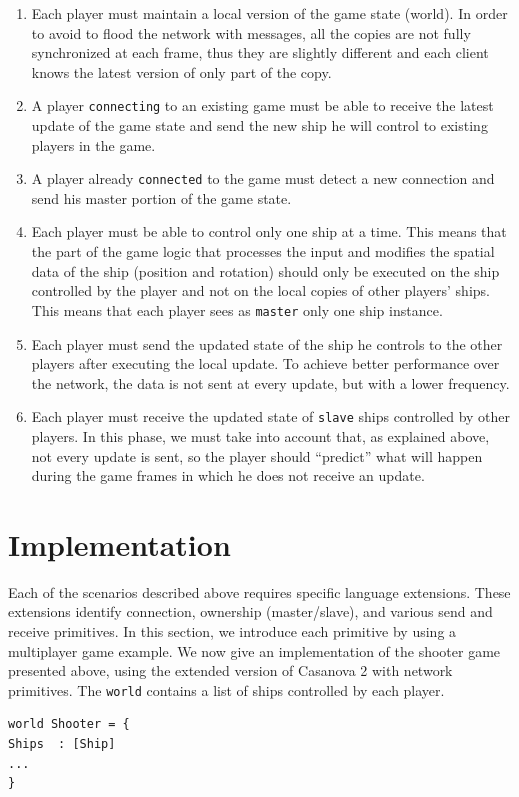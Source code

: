 \begin{enumerate}
	\item Each player must maintain a local version of the game state (world). In order to avoid to flood the network with messages, all the copies are not fully synchronized at each frame, thus they are slightly different and each client knows the latest version of only part of the copy.
	\item A player \texttt{connecting} to an existing game must be able to receive the latest update of the game state and send the new ship he will control to existing players in the game.
	\item A player already \texttt{connected} to the game must detect a new connection and send his master portion of the game state.
	\item Each player must be able to control only one ship at a time. This means that the part of the game logic that processes the input and modifies the spatial data of the ship (position and rotation) should only be executed on the ship controlled by the player and not on the local copies of other players' ships. This means that each player sees as \texttt{master} only one ship instance.
	\item Each player must send the updated state of the ship he controls to the other players after executing the local update. To achieve better performance over the network, the data is not sent at every update, but with a lower frequency.
	\item Each player must receive the updated state of \texttt{slave} ships controlled by other players. In this phase, we must take into account that, as explained above, not every update is sent, so the player should ``predict'' what will happen during the game frames in which he does not receive an update.
\end{enumerate}

\section{Implementation}
\label{sec:ch_networking_casanova_networking_primitives}
Each of the scenarios described above requires specific language extensions. These extensions identify connection, ownership (master/slave), and various send and receive primitives. In this section, we introduce each primitive by using a multiplayer game example. We now give an implementation of the shooter game presented above, using the extended version of Casanova 2 with network primitives. The \texttt{world} contains a list of ships controlled by each player.
\begin{lstlisting}
world Shooter = {
Ships  : [Ship]
...
}
\end{lstlisting}

